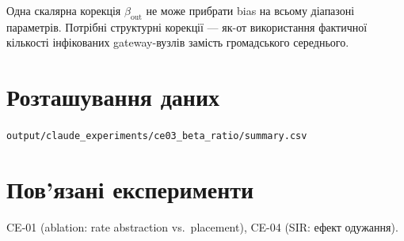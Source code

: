 \documentclass[11pt,a4paper]{article}
\begin{document}
Одна скалярна корекція $\beta_{\text{out}}$ не може прибрати bias
на всьому діапазоні параметрів.  Потрібні структурні корекції --- як-от
використання фактичної кількості інфікованих gateway-вузлів замість
громадського середнього.

\section*{Розташування даних}
\texttt{output/claude\_experiments/ce03\_beta\_ratio/summary.csv}

\section*{Пов'язані експерименти}
CE-01 (ablation: rate abstraction vs.\ placement), CE-04 (SIR: ефект одужання).
\end{document}
